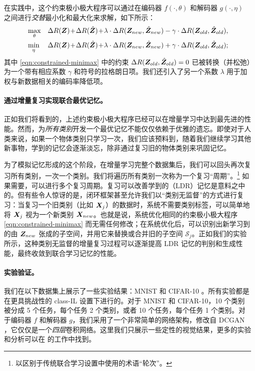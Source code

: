 \documentclass[../../book-main.tex]{subfiles}
\begin{document}
在实践中，这个约束极小极大程序可以通过在编码器 $f(\cdot, \theta)$ 和解码器 $g(\cdot, \eta)$ 之间进行{\em 交替}最小化和最大化来求解，如下所示：
\begin{eqnarray}
&\max_\theta  &\Delta{R(\Z)}\!+\!\Delta{R(\hat{\Z})}\!+\!\lambda\cdot  \Delta{R(\Z_{new},\hat{\Z}_{new})} - \gamma\cdot \Delta{R(\Z_{old},\hat{\Z}_{old})}, \label{eqn:relaxed-max}\\ 
&\min_\eta &\Delta{R(\Z)}\!+\!\Delta{R(\hat{\Z})}\!+\!\lambda\cdot \Delta{R(\Z_{new},\hat{\Z}_{new})} + \gamma\cdot \Delta{R(\Z_{old},\hat{\Z}_{old})}; \label{eqn:relaxed-min}
\end{eqnarray}
其中 \eqref{eqn:constrained-minimax} 中的约束 $\Delta R(\bm{Z}_{old},\hat{\bm{Z}}_{old}) = 0$ 已被转换（并松弛）为一个带有相应系数 $\gamma$ 和符号的拉格朗日项。我们还引入了另一个系数 $\lambda$ 用于加权与新数据相关的编码率降低项。%



\paragraph{通过增量复习实现联合最优记忆。} 
正如我们将看到的，上述约束极小极大程序已经可以在增量学习中达到最先进的性能。然而，为{\em 所有类别}开发一个最优记忆不能仅仅依赖于优雅的遗忘。即使对于人类来说，如果一个物体类别只学习一次，我们应该预料到，随着我们继续学习其他新事物，学到的记忆会逐渐淡忘，除非通过复习旧的物体类别来巩固记忆。

为了模拟记忆形成的这个阶段，在增量学习完整个数据集后，我们可以回头再次复习所有类别，一次一个类别。我们将遍历所有类别一次称为一个复习“周期”。\footnote{以区别于传统联合学习设置中使用的术语“轮次”。} 如果需要，可以进行多个复习周期。复习可以改善学到的（LDR）记忆是意料之中的。但有些令人惊讶的是，闭环框架甚至允许我们以“{类别无监督}”的方式进行复习：当复习一个旧类别（比如 $\bm{X}_j$）的数据时，系统不需要类别标签，可以简单地将 $\bm{X}_j$ 视为一个新类别 $\bm{X}_{new}$。也就是说，系统优化相同的约束极小极大程序 \eqref{eqn:constrained-minimax} 而无需任何修改；在系统优化后，可以识别出新学习到的由 $\bm{Z}_{new}$ 张成的子空间，并用它来替换或合并旧的子空间 $\mathcal{S}_j$。正如我们的实验所示，这种类别无监督的增量复习过程可以逐渐提高 LDR 记忆的判别和生成性能，最终收敛到联合学习记忆的性能。

\paragraph{实验验证。}
我们在以下数据集上展示了一些实验结果：MNIST \cite{lecun1998gradient} 和 CIFAR-10 \cite{krizhevsky2014cifar}。所有实验都是在更具挑战性的 class-IL 设置下进行的。对于 MNIST 和 CIFAR-10，10 个类别被分成 5 个任务，每个任务 2 个类别，或者 10 个任务，每个任务 1 个类别。对于编码器 $f$ 和解码器 $g$，我们采用了一个非常简单的网络架构，修改自 DCGAN \cite{radford2016unsupervised}，它仅仅是一个{\em 四层}卷积网络。这里我们只展示一些定性的视觉结果，更多的实验和分析可以在 \cite{tong2023incremental} 的工作中找到。
\end{document}
